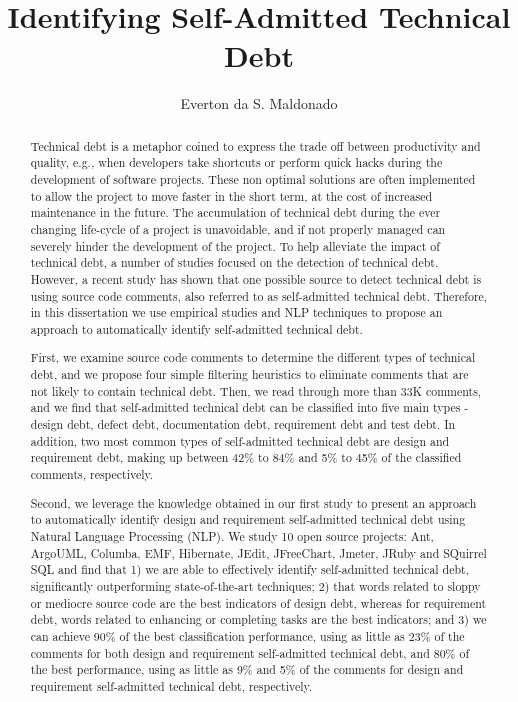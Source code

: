 \documentclass[12pt]{report}
\author{Everton da S. Maldonado}
\title {Identifying Self-Admitted Technical Debt}
\newcommand{\SATD}{self-admitted technical debt\xspace}
\begin{document}
\begin{abstract}

Technical debt is a metaphor coined to express the trade off between productivity and quality, e.g., when developers take shortcuts or perform quick hacks during the development of software projects. These non optimal solutions are often implemented to allow the project to move faster in the short term, at the cost of increased maintenance in the future. The accumulation of technical debt during the ever changing life-cycle of a project is unavoidable, and if not properly managed can severely hinder the development of the project. To help alleviate the impact of technical debt, a number of studies focused on the detection of technical debt. However, a recent study has shown that one possible source to detect technical debt is using source code comments, also referred to as self-admitted technical debt. Therefore, in this dissertation we use empirical studies and NLP techniques to propose an approach to automatically identify \SATD. 

First, we examine source code comments to determine the different types of technical debt, and we propose four simple filtering heuristics to eliminate comments that are not likely to contain technical debt. Then, we read through more than 33K comments, and we find that self-admitted technical debt can be classified into five main types - design debt, defect debt, documentation debt, requirement debt and test debt. In addition, two most common types of self-admitted technical debt are design and requirement debt, making up between 42\% to 84\% and 5\% to 45\% of the classified comments, respectively. 

Second, we leverage the knowledge obtained in our first study to present an approach to automatically identify design and requirement self-admitted technical debt using Natural Language Processing (NLP). We study 10 open source projects: Ant, ArgoUML, Columba, EMF, Hibernate, JEdit, JFreeChart, Jmeter, JRuby and SQuirrel SQL and find that 1) we are able to effectively identify self-admitted technical debt, significantly outperforming state-of-the-art techniques; 2) that words related to sloppy or mediocre source code are the best indicators of design debt, whereas for requirement debt, words related to enhancing or completing tasks are the best indicators; and 3)  we can achieve 90\% of the best classification performance, using as little as 23\% of the comments for both design and requirement self-admitted technical debt, and 80\% of the best performance, using as little as 9\% and 5\% of the comments for design and requirement self-admitted technical debt, respectively.

\end{abstract}
\end{document}
